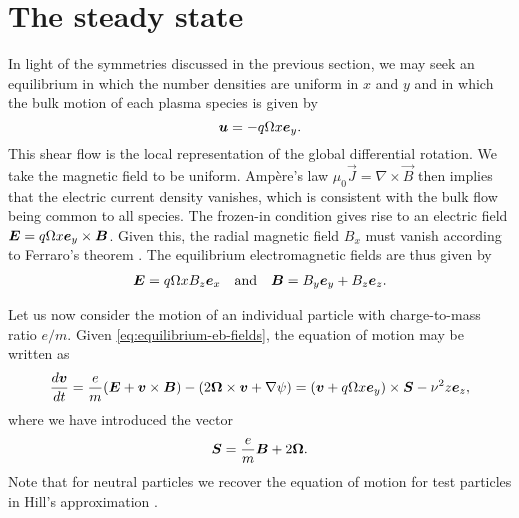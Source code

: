\documentclass[aps,pre,notitlepage,amsmath,amssymb,amsfonts,nobibnotes,nofootinbib,superscriptaddress]{revtex4-1}
\begin{document}
\section{The steady state}
\label{sec:steady-state}

In light of the symmetries discussed in the previous section, we may seek an
equilibrium in which the number densities are uniform in $x$ and $y$ and in
which the bulk motion of each plasma species is given by
\begin{equation}
  \label{eq:shear-flow}
  \vec{u} = -q\Omega x\ey.
\end{equation}
This shear flow is the local representation of the global differential
rotation. We take the magnetic field to be uniform. Ampère's law
$\mu_0\vec{J}=\nabla\times\vec{B}$ then implies that the electric current
density vanishes, which is consistent with the bulk flow
 being common to all species. The frozen-in condition
gives rise to an electric field $\bm{E}=q\Omega{}x\bm{e}_y\times\bm{B}$. Given
this, the radial magnetic field $B_x$ must vanish according to Ferraro's
theorem \citep{Ferraro1937}. The equilibrium electromagnetic fields are thus
given by
\begin{align}
  \label{eq:equilibrium-eb-fields}
  \vec{E} = q\Omega xB_z\ex
  \quad\textrm{and}\quad
  \vec{B} = B_y\ey + B_z\ez.
\end{align}

Let us now consider the motion of an individual particle with charge-to-mass
ratio $e/m$. Given \cref{eq:equilibrium-eb-fields}, the equation of motion may
be written as
\begin{equation}
  \label{eq:particle-eom}
  \der{\vec{v}}{t} =
  \cm(\vec{E} + \vec{v}\times\vec{B})
  - (2\vec{\Omega}\times\vec{v} + \nabla\psi) =
  (\vec{v} + q\Omega x\ey)\times\vec{S} - \vfreq^2 z\ez,
\end{equation}
where we have introduced the vector
\begin{equation}
  \label{eq:spin}
  \vec{S} = \cm\vec{B} + 2\vec{\Omega}.
\end{equation}
Note that for neutral particles we recover the equation of motion for test
particles in Hill's approximation \citep{Hill1878}.
\end{document}
